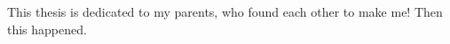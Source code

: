 
\begin{dedication} 

This thesis is dedicated to my parents, who found each other to make me! Then this happened.

\end{dedication}

